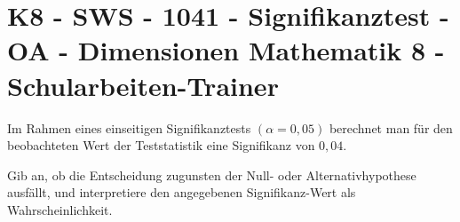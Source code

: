 \section{K8 - SWS - 1041 - Signifikanztest - OA - Dimensionen Mathematik 8 - Schularbeiten-Trainer}

\begin{beispiel}[K8 - SWS]{1}
Im Rahmen eines einseitigen Signifikanztests $(\alpha=0,05)$ berechnet man für den beobachteten Wert der Teststatistik eine Signifikanz von $0,04$.

Gib an, ob die Entscheidung zugunsten der Null- oder Alternativhypothese ausfällt, und interpretiere den angegebenen Signifikanz-Wert als Wahrscheinlichkeit.

\end{beispiel}